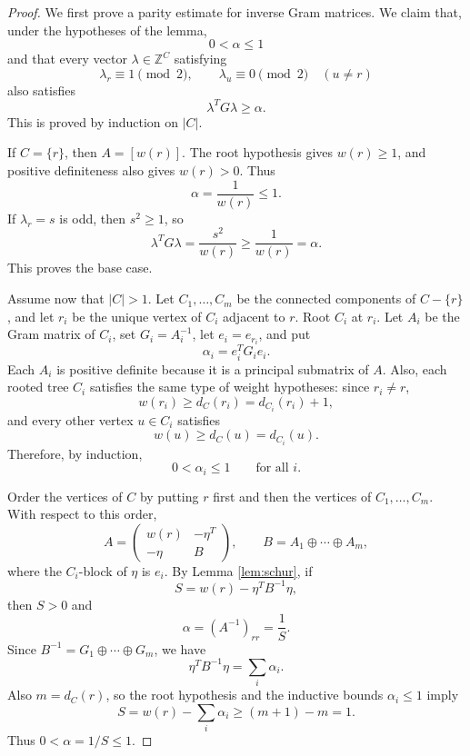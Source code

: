\documentclass[12pt]{article}
\newcommand{\Z}{\mathbb{Z}}
\begin{document}
\begin{proof}
We first prove a parity estimate for inverse Gram matrices. We claim that, under the hypotheses of the lemma,
\[
0<\alpha\le 1
\]
and that every vector \(\lambda\in\Z^C\) satisfying
\[
\lambda_r\equiv 1\pmod 2,
\qquad
\lambda_u\equiv 0\pmod 2\quad(u\ne r)
\]
also satisfies
\[
\lambda^T G\lambda\ge \alpha.
\]
This is proved by induction on \(|C|\).

If \(C=\{r\}\), then \(A=[w(r)]\). The root hypothesis gives \(w(r)\ge 1\), and positive definiteness also gives \(w(r)>0\). Thus
\[
\alpha=\frac{1}{w(r)}\le 1.
\]
If \(\lambda_r=s\) is odd, then \(s^2\ge 1\), so
\[
\lambda^TG\lambda=\frac{s^2}{w(r)}\ge \frac{1}{w(r)}=\alpha.
\]
This proves the base case.

Assume now that \(|C|>1\). Let \(C_1,\dots,C_m\) be the connected components of \(C-\{r\}\), and let \(r_i\) be the unique vertex of \(C_i\) adjacent to \(r\). Root \(C_i\) at \(r_i\). Let \(A_i\) be the Gram matrix of \(C_i\), set \(G_i=A_i^{-1}\), let \(e_i=e_{r_i}\), and put
\[
\alpha_i=e_i^TG_ie_i.
\]
Each \(A_i\) is positive definite because it is a principal submatrix of \(A\). Also, each rooted tree \(C_i\) satisfies the same type of weight hypotheses: since \(r_i\ne r\),
\[
w(r_i)\ge d_C(r_i)=d_{C_i}(r_i)+1,
\]
and every other vertex \(u\in C_i\) satisfies
\[
w(u)\ge d_C(u)=d_{C_i}(u).
\]
Therefore, by induction,
\[
0<\alpha_i\le 1
\qquad\text{for all }i.
\]

Order the vertices of \(C\) by putting \(r\) first and then the vertices of \(C_1,\dots,C_m\). With respect to this order,
\[
A=
\begin{pmatrix}
w(r) & -\eta^T\\
-\eta & B
\end{pmatrix},
\qquad
B=A_1\oplus\cdots\oplus A_m,
\]
where the \(C_i\)-block of \(\eta\) is \(e_i\). By Lemma \ref{lem:schur}, if
\[
S=w(r)-\eta^TB^{-1}\eta,
\]
then \(S>0\) and
\[
\alpha=(A^{-1})_{rr}=\frac{1}{S}.
\]
Since \(B^{-1}=G_1\oplus\cdots\oplus G_m\), we have
\[
\eta^TB^{-1}\eta=\sum_i \alpha_i.
\]
Also \(m=d_C(r)\), so the root hypothesis and the inductive bounds \(\alpha_i\le 1\) imply
\[
S=w(r)-\sum_i\alpha_i
\ge (m+1)-m
=1.
\]
Thus \(0<\alpha=1/S\le 1\).


\end{proof}
\end{document}
